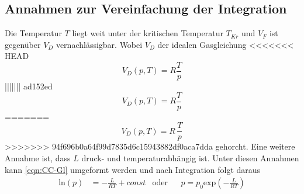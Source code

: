 
\subsection{Annahmen zur Vereinfachung der Integration} %
\label{sub:Vereinfachung}
Die Temperatur $T$ liegt weit unter der kritischen Temperatur $T_{Kr}$ und $V_F$ ist gegenüber $V_D$ vernachlässigbar.
Wobei $V_D$ der idealen Gasgleichung
<<<<<<< HEAD
\begin{equation}
    V_D(p,T) = R\frac{T}{p}\label{eqn:idGas}
\end{equation}
||||||| ad152ed
\begin{equation*}
    V_D(p,T) = R\frac{T}{p}
\end{equation*}
=======
\begin{equation*}
    V_D(p,T) = R\,\frac{T}{p}
\end{equation*}
>>>>>>> 94f696b0a64f99d7835d6c15943882df0aca7dda
gehorcht.
Eine weitere Annahme ist, dass $L$ druck- und temperaturabhängig ist. 
Unter diesen Annahmen kann \autoref{eqn:CC-Gl} umgeformt werden und nach Integration folgt daraus
\begin{align}
    \text{ln}(p) &= -\frac{L}{RT}+const &\text{oder} && p=p_0 \text{exp}(-\frac{L}{RT})
    \label{eqn:CC-Gl_2}
\end{align}
 